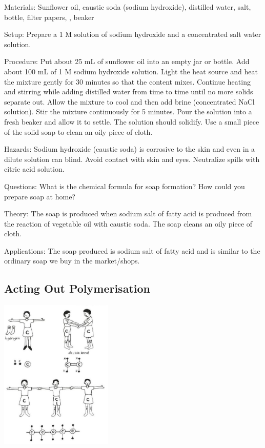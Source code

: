 \begin{multicols}{2}
\begin{description*}
\item[Materials:]{Sunflower oil, caustic soda (sodium hydroxide), distilled water, salt, bottle, filter papers, , beaker}
\item[Setup:]{Prepare a 1 M solution of sodium hydroxide and a concentrated salt water solution.}
\item[Procedure:]{Put about 25 mL of sunflower oil into an empty jar or bottle. Add about 100 mL of 1 M sodium hydroxide solution. Light the heat source and heat the mixture gently for 30 minutes so that the content mixes. Continue heating and stirring while adding distilled water from time to time until no more solids separate out. Allow the mixture to cool and then add brine (concentrated NaCl solution). Stir the mixture continuously for 5 minutes. Pour the solution into a fresh beaker and allow it to settle. The solution should solidify. Use a small piece of the solid soap to clean an oily piece of cloth.}
\item[Hazards:]{Sodium hydroxide (caustic soda) is corrosive to the skin and even in a dilute solution can blind. Avoid contact with skin and eyes. Neutralize spills with citric acid solution.}
\item[Questions:]{What is the chemical formula for soap formation? How could you prepare soap at home?}
\item[Theory:]{The soap is produced when sodium salt of fatty acid is produced from the reaction of vegetable oil with caustic soda. The soap cleans an oily piece of cloth.}
\item[Applications:]{The soap produced is sodium salt of fatty acid and is similar to the ordinary soap we buy in the market/shops.}
\end{description*}

\subsection{Acting Out Polymerisation}

\begin{center}
\includegraphics[width=0.4\textwidth]{./img/vso/polymerisation.jpg}
\end{center}


\end{multicols}
